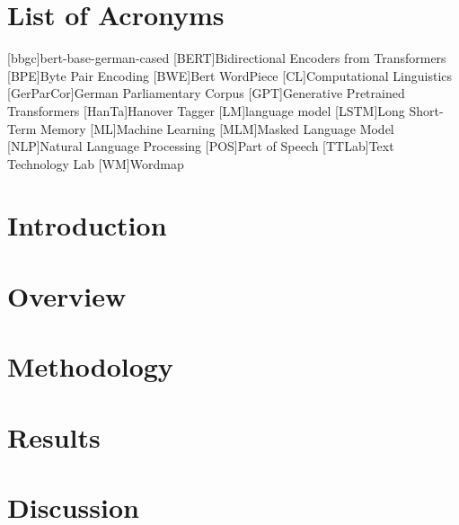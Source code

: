 \documentclass[12pt, a4paper, english]{ttlab-qualify}
\begin{document}
    \chapter*{List of Acronyms}
    \begin{acronym}
        [bbgc]{bert-base-german-cased}
        [BERT]{Bidirectional Encoders from Transformers}
        [BPE]{Byte Pair Encoding}
        [BWE]{Bert WordPiece}
        [CL]{Computational Linguistics}
        [GerParCor]{German Parliamentary Corpus}
        [GPT]{Generative Pretrained Transformers}
        [HanTa]{Hanover Tagger}
        [LM]{language model}
        [LSTM]{Long Short-Term Memory}
        [ML]{Machine Learning}
        [MLM]{Masked Language Model}
        [NLP]{Natural Language Processing}
        [POS]{Part of Speech}
        [TTLab]{Text Technology Lab}
        [WM]{Wordmap}

    \end{acronym}

    \cleardoubleoddpage


    \chapter{Introduction}
    \setcounter{page}{1}
    \label{ch:introduction}
    

    \chapter{Overview}
    \label{ch:overview}
    


    \chapter{Methodology}
    \label{ch:methodology}
    


    \chapter{Results}
    \label{ch:results}
    


    \chapter{Discussion}
    \label{ch:discussion}
    
\end{document}
